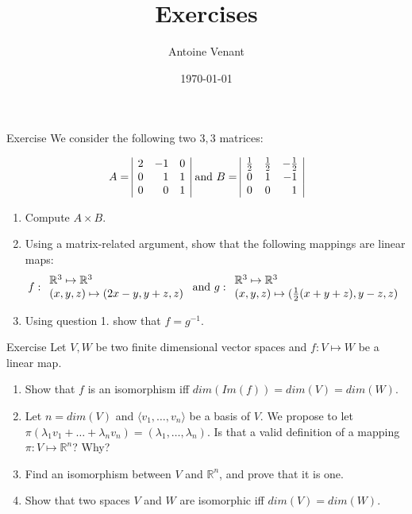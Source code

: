 \documentclass{beamer}
\begin{document}
\title{Exercises} 
\author{Antoine Venant}
\date{\today}
\maketitle

\begin{frame}{Exercise}
  We consider the following two $3,3$ matrices:

  \[ A =
  \begin{array}{|ccc|}
    2 & -1 & 0\\
    0 & \phantom{-}1 & 1\\
    0 & \phantom{-}0 & 1\\
  \end{array}
  \textnormal{ and }
  B =
  \begin{array}{|ccc|}
    \frac{1}{2} & \frac{1}{2} & -\frac{1}{2}\\
    0 & 1 & -1\\
    0 & 0 & \phantom{-}1\\
  \end{array}
  \]

  \begin{enumerate}
  \item Compute $A \times B$.
  \item Using a matrix-related argument, show that the following mappings are linear maps:
    \[f:\begin{array}{l} \mathbb{R}^3 \mapsto \mathbb{R}^3\\ (x, y, z) \mapsto (2x - y, y + z, z) \end{array} \textnormal{ and } g:\begin{array}{l} \mathbb{R}^3 \mapsto \mathbb{R}^3\\ (x, y, z) \mapsto (\frac{1}{2}(x + y + z), y - z, z) \end{array}\]
  \item Using question 1. show that $f = g^{-1}$.
  \end{enumerate}
\end{frame}

\begin{frame}{Exercise}
  Let $V, W$ be two finite dimensional vector spaces and $f: V \mapsto W$ be a linear map.
  \begin{enumerate}
  \item Show that $f$ is an isomorphism iff $dim(Im(f)) = dim(V) = dim(W)$.
  \item Let $n = dim(V)$ and $\langle v_1, \dots, v_n \rangle$ be a basis of $V$. We propose to let $\pi(\lambda_1 v_1 + \dots + \lambda_n v_n) = (\lambda_1, \dots, \lambda_n)$. Is that a valid definition of a mapping $\pi: V \mapsto \mathbb{R}^n$? Why?
  \item Find an isomorphism between $V$ and $\mathbb{R}^n$, and prove that it is one.
  \item Show that two spaces $V$ and $W$ are isomorphic iff $dim(V) = dim(W)$.
  \end{enumerate}
\end{frame}
\end{document}
